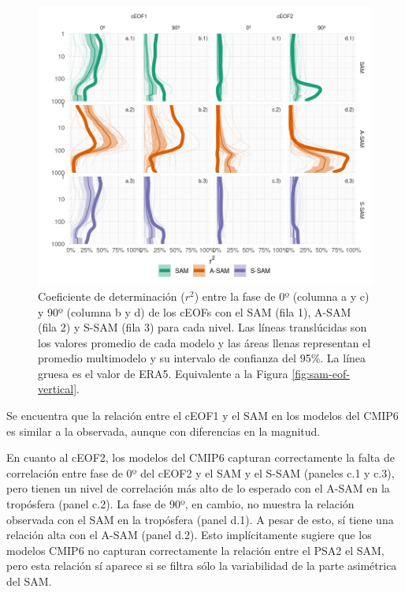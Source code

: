 \documentclass[12pt,oneside,a4paper]{reedthesis}
\begin{document}
\begin{figure}

{\centering \includegraphics{figures/50-cmip6/cor-sam-cmip6-1} 

}

\caption{Coeficiente de determinación (\(r^2\)) entre la fase de 0º (columna a y c) y 90º (columna b y d) de los cEOFs con el SAM (fila 1), A-SAM (fila 2) y S-SAM (fila 3) para cada nivel. Las líneas translúcidas son los valores promedio de cada modelo y las áreas llenas representan el promedio multimodelo y su intervalo de confianza del 95\%. La línea gruesa es el valor de ERA5. Equivalente a la Figura \ref{fig:sam-eof-vertical}.}\label{fig:cor-sam-cmip6}
\end{figure}



Se encuentra que la relación entre el cEOF1 y el SAM en los modelos del CMIP6 es similar a la observada, aunque con diferencias en la magnitud.

En cuanto al cEOF2, los modelos del CMIP6 capturan correctamente la falta de correlación entre fase de 0º del cEOF2 y el SAM y el S-SAM (paneles c.1 y c.3), pero tienen un nivel de correlación más alto de lo esperado con el A-SAM en la tropósfera (panel c.2).
La fase de 90º, en cambio, no muestra la relación observada con el SAM en la tropósfera (panel d.1).
A pesar de esto, sí tiene una relación alta con el A-SAM (panel d.2).
Esto implícitamente sugiere que los modelos CMIP6 no capturan correctamente la relación entre el PSA2 el SAM, pero esta relación sí aparece si se filtra sólo la variabilidad de la parte asimétrica del SAM.
\end{document}
